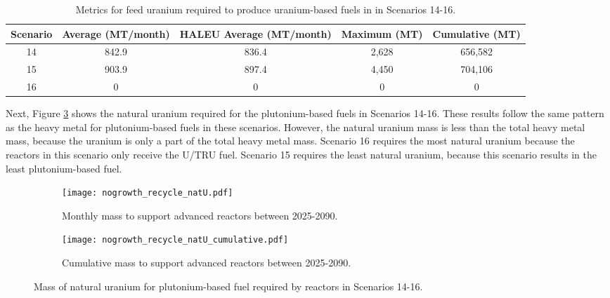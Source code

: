 \begin{table}[h!]
    \centering 
    \caption{Metrics for feed uranium required to produce 
    uranium-based fuels in in Scenarios 14-16.}
    \label{tab:s14-16_feed}
    \begin{tabular}{c c c c c}
        \hline 
        Scenario & Average (MT/month) & HALEU Average (MT/month) &
        Maximum (MT) & Cumulative (MT) \\
        \hline 
        14 & 842.9 & 836.4 & 2,628 & 656,582 \\
        15 & 903.9 & 897.4 & 4,450 & 704,106\\
        16 & 0 & 0 & 0 & 0\\
        \hline
        
    \end{tabular}
\end{table}

Next, Figure \ref{fig:nogrowth_recycle_natu} shows the natural 
uranium required for the plutonium-based fuels in Scenarios 14-16. 
These results follow the same pattern as the heavy metal for 
plutonium-based fuels in these scenarios. However, the natural 
uranium mass is less than the total heavy metal mass, because the 
uranium is only a part of the total heavy metal mass. Scenario 16 requires 
the most natural uranium because the reactors in this scenario 
only receive the U/TRU fuel. Scenario 15 requires the least 
natural uranium, because this scenario results in the least 
plutonium-based fuel.

\begin{figure}[h!]
    \centering
    \begin{subfigure}[b]{0.45\textwidth}
        \centering
        \texttt{[image: nogrowth\_recycle\_natU.pdf]}
        \caption{Monthly mass to support
        advanced reactors between 2025-2090.}
        \label{fig:nogrowth_recycle_AR_natu}
    \end{subfigure}
    \hfill
    \begin{subfigure}[b]{0.45\textwidth}
        \centering
        \texttt{[image: nogrowth\_recycle\_natU\_cumulative.pdf]}
        \caption{Cumulative mass to support advanced reactors between 2025-2090.}
        \label{fig:nogrowth_recycle_natu_cumulative}
    \end{subfigure}
       \caption{Mass of natural uranium for plutonium-based fuel required 
       by reactors
        in Scenarios 14-16.}
       \label{fig:nogrowth_recycle_natu}
\end{figure}

